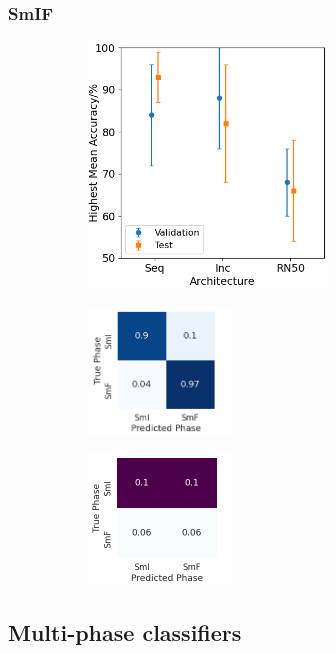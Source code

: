 \documentclass[12pt]{article}
\begin{document}
\subsubsection{SmIF}
\begin{figure}[!h]
\centering
\begin{subfigure}{0.4\textwidth}
	\centering
	\includegraphics[width=2.5in]{images/Graphs/SmIF.png}
	\caption{}
	\label{smif:graph}
\end{subfigure}%
\begin{subfigure}{0.25\textwidth}
	\centering
	\includegraphics[width=1.5in]{images/ConMats/SmIF_mean.png}
	\caption{}
	\label{smif:mean}
\end{subfigure}%
\begin{subfigure}{0.25\textwidth}
	\centering
	\includegraphics[width=1.5in]{images/ConMats/SmIF_std.png}
	\caption{}
	\label{smif:std}
\end{subfigure}%
\caption{}
\label{smif:smif}
\end{figure}

\subsection{Multi-phase classifiers}
\end{document}

